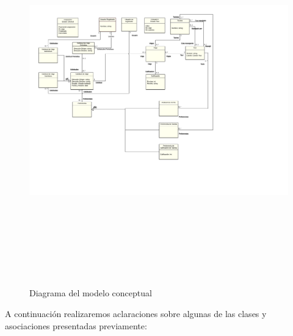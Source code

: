 \documentclass[a4paper, 10pt, twoside]{article}
\begin{document}
\begin{figure}[H]
  \includegraphics[type=png,ext=.png,read=.png,height=16cm,angle=90]{diagramas/conceptual}%
  \caption{Diagrama del modelo conceptual}
  \label{fig:diagrama-conceptual}
\end{figure}

A continuación realizaremos aclaraciones sobre algunas de las clases y asociaciones presentadas previamente:
\end{document}
